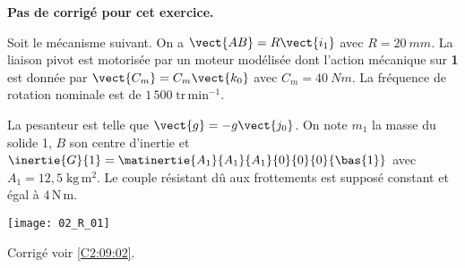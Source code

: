 \normaltrue
\correctionfalse


\setcounter{numques}{0}
\ifcorrection
\else
\textbf{Pas de corrigé pour cet exercice.}
\fi

\ifprof
\else


Soit le mécanisme suivant. On a $\vect{AB}=R\vect{i_1}$ avec $R=\SI{20}{mm}$. La liaison pivot est motorisée par un moteur modélisée dont l'action mécanique sur \textbf{1} est donnée par $\vect{C_m}=C_m \vect{k_0}$ avec $C_m = \SI{40}{Nm}$. La fréquence de rotation nominale est de $1\,500\; \text{tr}\,\text{min}^{-1}$. 

 La pesanteur est telle que $\vect{g}=-g\vect{j_0}$.
On note $m_1$ la masse du solide 1, $B$ son centre d'inertie et $\inertie{G}{1}=\matinertie{A_1}{A_1}{A_1}{0}{0}{0}{\bas{1}}$ avec $A_1 = 12,5\; \text{kg}\,\text{m}^2$.
 Le couple résistant dû aux frottements est supposé constant et égal à $4\, \text{N} \, \text{m}$.

\begin{center}
\texttt{[image: 02\_R\_01]}
\end{center}

\fi
{}
\ifprof
\else
\fi

\fi
{}
\ifprof
\else
\fi



\ifprof
\else
\begin{flushright}
\footnotesize{Corrigé  voir \ref{C2:09:02}.}
\end{flushright}%
\fi